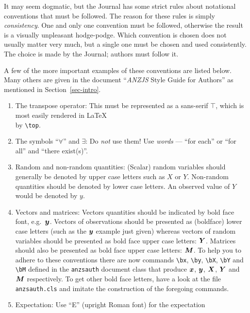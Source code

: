 \documentclass[
  times,
  doublespace]{anzsauth}
\providecommand{\tightlist}{%
  \setlength{\itemsep}{0pt}\setlength{\parskip}{0pt}}\usepackage{longtable,booktabs,array}
\begin{document}
It may seem dogmatic, but the Journal has some strict rules about
notational conventions that must be followed. The reason for these rules
is simply \emph{consistency}. One and only one convention must be
followed, otherwise the result is a visually unpleasant hodge-podge.
Which convention is chosen does not usually matter very much, but a
single one must be chosen and used consistently. The choice is made by
the Journal; authors must follow it.

A few of the more important examples of these conventions are listed
below. Many others are given in the document ``\emph{ANZJS} Style Guide
for Authors'' as mentioned in Section~\ref{sec-intro}.

\begin{enumerate}
\def\labelenumi{\arabic{enumi}.}
\tightlist
\item
  The transpose operator: This must be represented as a sans-serif
  \(\top\), which is most easily rendered in \LaTeX\\
  by \texttt{\textbackslash{}top}.
\item
  The symbols ``\(\forall\)'' and \(\exists\): Do \emph{not} use them!
  Use \emph{words} --- ``for each'' or ``for all'' and ``there
  exist(s)''.
\item
  Random and non-random quantities: (Scalar) random variables should
  generally be denoted by upper case letters such as \(X\) or \(Y\).
  Non-random quantities should be denoted by lower case letters. An
  observed value of \(Y\) would be denoted by \(y\).
\item
  Vectors and matrices: Vectors quantities should be indicated by bold
  face font, e.g.~\(\mbox{$\boldsymbol{y}$}\). Vectors of observations should be presented
  as (boldface) lower case letters (such as the \(\mbox{$\boldsymbol{y}$}\) example just
  given) whereas vectors of random variables should be presented as bold
  face upper case letters: \(\mbox{$\boldsymbol{Y}$}\). Matrices should also be presented as
  bold face upper case letters: \(\mbox{$\boldsymbol{M}$}\). To help you to adhere to these
  conventions there are now commands \texttt{\textbackslash{}bx},
  \texttt{\textbackslash{}by}, \texttt{\textbackslash{}bX},
  \texttt{\textbackslash{}bY} and \texttt{\textbackslash{}bM} defined in
  the \texttt{anzsauth} document class that produce \(\mbox{$\boldsymbol{x}$}\), \(\mbox{$\boldsymbol{y}$}\),
  \(\mbox{$\boldsymbol{X}$}\), \(\mbox{$\boldsymbol{Y}$}\) and \(\mbox{$\boldsymbol{M}$}\) respectively. To get other bold face
  letters, have a look at the file \texttt{anzsauth.cls} and imitate the
  construction of the foregoing commands.
\item
  Expectation: Use ``E'' (upright Roman font) for the expectation

\end{enumerate}
\end{document}
